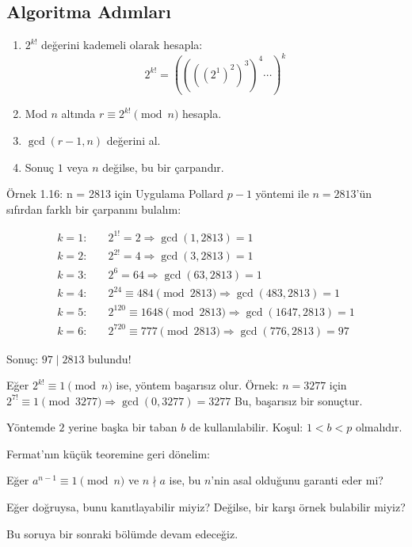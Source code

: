 \documentclass[12pt]{article}
\begin{document}
\subsection*{Algoritma Adımları}

\begin{enumerate}
    \item $2^{k!}$ değerini kademeli olarak hesapla:
    \[
    2^{k!} = ((((2^1)^2)^3)^4 \cdots )^k
    \]
    \item Mod $n$ altında $r \equiv 2^{k!} \pmod{n}$ hesapla.
    \item $\gcd(r - 1, n)$ değerini al.
    \item Sonuç $1$ veya $n$ değilse, bu bir çarpandır.
\end{enumerate}

\begin{examplebox}{Örnek 1.16: n = 2813 için Uygulama}
Pollard $p - 1$ yöntemi ile $n = 2813$'ün sıfırdan farklı bir çarpanını bulalım:

\begin{align*}
k = 1: &\quad 2^{1!} = 2 \Rightarrow \gcd(1, 2813) = 1 \\
k = 2: &\quad 2^{2!} = 4 \Rightarrow \gcd(3, 2813) = 1 \\
k = 3: &\quad 2^6 = 64 \Rightarrow \gcd(63, 2813) = 1 \\
k = 4: &\quad 2^{24} \equiv 484 \pmod{2813} \Rightarrow \gcd(483, 2813) = 1 \\
k = 5: &\quad 2^{120} \equiv 1648 \pmod{2813} \Rightarrow \gcd(1647, 2813) = 1 \\
k = 6: &\quad 2^{720} \equiv 777 \pmod{2813} \Rightarrow \gcd(776, 2813) = \boxed{97}
\end{align*}

Sonuç: $97 \mid 2813$ bulundu!
\end{examplebox}

\begin{warningbox}
Eğer $2^{k!} \equiv 1 \pmod{n}$ ise, yöntem başarısız olur.  
Örnek: $n = 3277$ için $2^{7!} \equiv 1 \pmod{3277} \Rightarrow \gcd(0, 3277) = 3277$  
Bu, başarısız bir sonuçtur.
\end{warningbox}

\begin{highlightbox}
Yöntemde $2$ yerine başka bir taban $b$ de kullanılabilir.  
Koşul: $1 < b < p$ olmalıdır.
\end{highlightbox}

\begin{discussionbox}
Fermat'nın küçük teoremine geri dönelim:

Eğer $a^{n-1} \equiv 1 \pmod{n}$ ve $n \nmid a$ ise, bu $n$'nin asal olduğunu garanti eder mi?

Eğer doğruysa, bunu kanıtlayabilir miyiz?  
Değilse, bir karşı örnek bulabilir miyiz?

Bu soruya bir sonraki bölümde devam edeceğiz.
\end{discussionbox}
\end{document}
